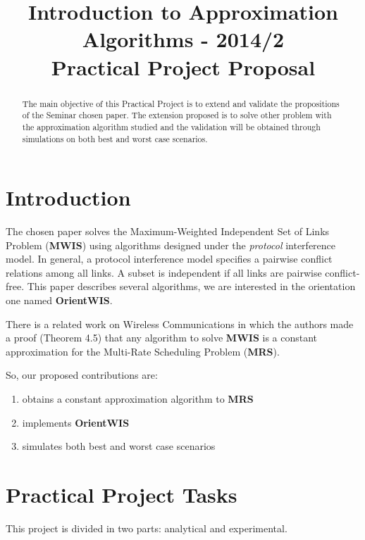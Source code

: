 \documentclass[conference]{IEEEtran}
\begin{document}
  \title{Introduction to Approximation Algorithms - 2014/2 \\ Practical Project Proposal}
  \author{
  }
  \maketitle
  \begin{abstract}
    The main objective of this Practical Project is to extend and validate 
    the propositions of the Seminar chosen paper. The extension proposed
    is to solve other problem with the approximation algorithm studied and
    the validation will be obtained through simulations on both best and worst case scenarios.
  \end{abstract}
  \section{Introduction}
    The chosen paper \cite{pengjun:2014} solves the Maximum-Weighted Independent Set of Links Problem ({\bf MWIS})
    using algorithms designed under the {\it protocol} interference model. 
    In general, a protocol interference model specifies a pairwise conflict relations among all links.
    A subset is independent if all links are pairwise conflict-free.
    This paper describes several algorithms, we are interested in the orientation one named {\bf OrientWIS}.

    There is a related work on Wireless Communications \cite{olga:2012} in which the authors made a proof (Theorem 4.5) that 
    any algorithm to solve {\bf MWIS} is a constant approximation for the Multi-Rate Scheduling Problem ({\bf MRS}).

    So, our proposed contributions are:
    \begin{enumerate} 
      \item obtains a constant approximation algorithm to {\bf MRS}
      \item implements {\bf OrientWIS}
      \item simulates both best and worst case scenarios
    \end{enumerate}
  \section{Practical Project Tasks}
    This project is divided in two parts: analytical and experimental.
\end{document}
